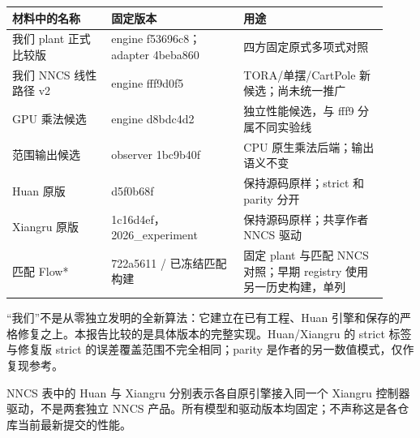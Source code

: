 \documentclass[UTF8,fontset=fandol,11pt,a4paper]{ctexart}
\begin{document}
\small
\par\noindent
{\setlength{\tabcolsep}{2pt}\renewcommand{\arraystretch}{1.25}
\begin{tabular}{>{\raggedright\arraybackslash}p{0.248\linewidth}>{\raggedright\arraybackslash}p{0.322\linewidth}>{\raggedright\arraybackslash}p{0.350\linewidth}}
\toprule
\textbf{材料中的名称} & \textbf{固定版本} & \textbf{用途} \\
\midrule
我们 plant 正式比较版 & engine f53696c8；adapter 4beba860 & 四方固定原式多项式对照 \\
我们 NNCS 线性路径 v2 & engine fff9d0f5 & TORA/\allowbreak{}单摆/\allowbreak{}CartPole 新候选；尚未统一推广 \\
GPU 乘法候选 & engine d8bdc4d2 & 独立性能候选，与 fff9 分属不同实验线 \\
范围输出候选 & observer 1bc9b40f & CPU 原生乘法后端；输出语义不变 \\
Huan 原版 & d5f0b68f & 保持源码原样；strict 和 parity 分开 \\
Xiangru 原版 & 1c16d4ef，2026\_\allowbreak{}experiment & 保持源码原样；共享作者 NNCS 驱动 \\
匹配 Flow* & 722a5611 /\allowbreak{} 已冻结匹配构建 & 固定 plant 与匹配 NNCS 对照；早期 registry 使用另一历史构建，单列 \\
\bottomrule
\end{tabular}
}
\par

\normalsize
“我们”不是从零独立发明的全新算法：它建立在已有工程、Huan 引擎和保存的严格修复之上。本报告比较的是具体版本的完整实现。Huan/\allowbreak{}Xiangru 的 strict 标签与修复版 strict 的误差覆盖范围不完全相同；parity 是作者的另一数值模式，仅作复现参考。

NNCS 表中的 Huan 与 Xiangru 分别表示各自原引擎接入同一个 Xiangru 控制器驱动，不是两套独立 NNCS 产品。所有模型和驱动版本均固定；不声称这是各仓库当前最新提交的性能。
\end{document}
